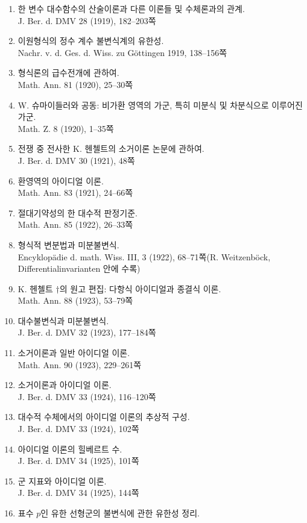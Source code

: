 \begin{enumerate}
Nachr. v. d. Ges. d. Wiss. zu Göttingen 1918, 235--257쪽
\item 한 변수 대수함수의 산술이론과 다른 이론들 및 수체론과의 관계.\\
J. Ber. d. DMV 28 (1919), 182--203쪽
\item 이원형식의 정수 계수 불변식계의 유한성.\\
Nachr. v. d. Ges. d. Wiss. zu Göttingen 1919, 138--156쪽
\item 형식론의 급수전개에 관하여.\\
Math. Ann. 81 (1920), 25--30쪽
\item W. 슈마이들러와 공동: 비가환 영역의 가군, 특히 미분식 및 차분식으로 이루어진 가군.\\
Math. Z. 8 (1920), 1--35쪽
\item 전쟁 중 전사한 K. 헨첼트의 소거이론 논문에 관하여.\\
J. Ber. d. DMV 30 (1921), 48쪽
\item 환영역의 아이디얼 이론.\\
Math. Ann. 83 (1921), 24--66쪽
\item 절대기약성의 한 대수적 판정기준.\\
Math. Ann. 85 (1922), 26--33쪽
\item 형식적 변분법과 미분불변식.\\
Encyklopädie d. math. Wiss. III, 3 (1922), 68--71쪽(R. Weitzenböck, Differentialinvarianten 안에 수록)
\item K. 헨첼트 \(\dagger\)의 원고 편집: 다항식 아이디얼과 종결식 이론.\\
Math. Ann. 88 (1923), 53--79쪽
\item 대수불변식과 미분불변식.\\
J. Ber. d. DMV 32 (1923), 177--184쪽
\item 소거이론과 일반 아이디얼 이론.\\
Math. Ann. 90 (1923), 229--261쪽
\item 소거이론과 아이디얼 이론.\\
J. Ber. d. DMV 33 (1924), 116--120쪽
\item 대수적 수체에서의 아이디얼 이론의 추상적 구성.\\
J. Ber. d. DMV 33 (1924), 102쪽
\item 아이디얼 이론의 힐베르트 수.\\
J. Ber. d. DMV 34 (1925), 101쪽
\item 군 지표와 아이디얼 이론.\\
J. Ber. d. DMV 34 (1925), 144쪽
\item 표수 \(p\)인 유한 선형군의 불변식에 관한 유한성 정리.\\

\end{enumerate}
